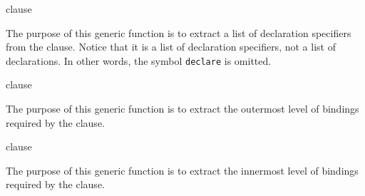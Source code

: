  {clause}

The purpose of this generic function is to extract a list of
declaration specifiers from the clause.  Notice that it is a list of
declaration specifiers, not a list of declarations.  In other words,
the symbol \texttt{declare} is omitted.

 {clause}

The purpose of this generic function is to extract the outermost level
of bindings required by the clause.

 {clause}

The purpose of this generic function is to extract the innermost level
of bindings required by the clause.
